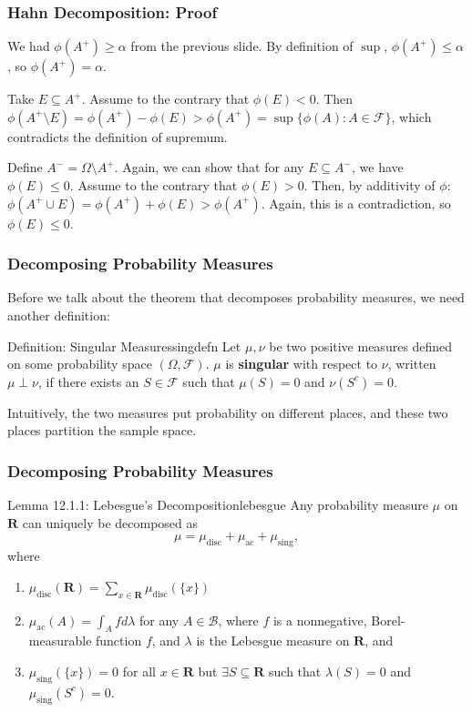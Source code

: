 \documentclass[handout]{beamer}
\begin{document}
\frame
{
\frametitle{Hahn Decomposition: Proof} 

We had $\phi(A^+) \ge \alpha$ from the previous slide. By definition of $\sup$, $\phi(A^+) \le \alpha$, so $\phi(A^+) = \alpha$.
\newline

Take $E \subseteq A^+$. Assume to the contrary that $\phi(E) < 0$. Then $\phi(A^+ \setminus E) = \phi(A^+) - \phi(E) > \phi(A^+) = \sup \{ \phi(A) : A \in \mathcal{F} \}$, which contradicts the definition of supremum. 
\newline


Define $A^- = \Omega \setminus A^+$. Again, we can show that for any $E \subseteq A^-$, we have $\phi(E) \le 0$. Assume to the contrary that $\phi(E) > 0$. Then, by additivity of $\phi$: $\phi(A^+ \cup E) = \phi(A^+) + \phi(E) > \phi(A^+)$. Again, this is a contradiction, so $\phi(E) \le 0$.


}


\frame
{
\frametitle{Decomposing Probability Measures} 


Before we talk about the theorem that decomposes probability measures, we need another definition:

\begin{mytheo}{Definition: Singular Measures}{singdefn}
Let $\mu, \nu$ be two positive measures defined on some probability space $(\Omega, \mathcal{F})$. $\mu$ is {\bf singular} with respect to $\nu$, written $\mu \perp \nu$, if there exists an $S \in \mathcal{F}$ such that $\mu(S) = 0$ and $\nu(S^c) = 0$. 
\end{mytheo}

Intuitively, the two measures put probability on different places, and these two places partition the sample space.

}



\frame
{
\frametitle{Decomposing Probability Measures} 


\begin{mytheo}{Lemma 12.1.1: Lebesgue's Decomposition}{lebesgue}
Any probability measure $\mu$ on $\mathbf{R}$ can uniquely be decomposed as 
$$
\mu= \mu_{\text{disc}} + \mu_{\text{ac}} + \mu_{\text{sing}},
$$
where
\begin{enumerate}
\item $\mu_{\text{disc}} ( \mathbf{R} ) = \sum_{x \in \mathbf{R}} \mu_{\text{disc}}(\{x\})$
\item $\mu_{\text{ac}}(A) = \int_A f d\lambda$ for any $A \in \mathcal{B}$, where $f$ is a nonnegative, Borel-measurable function $f$, and $\lambda$ is the Lebesgue measure on $\mathbf{R}$, and
\item $\mu_{\text{sing}}(\{x\}) = 0$ for all $x \in \mathbf{R}$ but $\exists S \subseteq \mathbf{R}$ such that $\lambda(S) = 0$ and $\mu_{\text{sing}}(S^c) = 0$.
\end{enumerate}
\end{mytheo}

}
\end{document}
